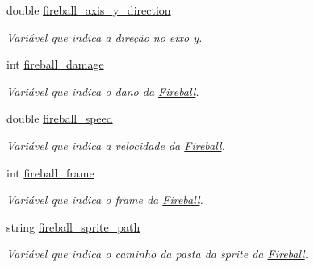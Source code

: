 \begin{DoxyCompactItemize}
double \mbox{\hyperlink{classFireball_a1d912b1e4229e9de2864024fc8b7f0a9}{fireball\+\_\+axis\+\_\+y\+\_\+direction}}
\begin{DoxyCompactList}\small\item\em Variável que indica a direção no eixo y. \end{DoxyCompactList}\item 
\mbox{\label{classFireball_a2ec7e1493414e15be2eef47f58010622}} 
int \mbox{\hyperlink{classFireball_a2ec7e1493414e15be2eef47f58010622}{fireball\+\_\+damage}}
\begin{DoxyCompactList}\small\item\em Variável que indica o dano da \mbox{\hyperlink{classFireball}{Fireball}}. \end{DoxyCompactList}\item 
\mbox{\label{classFireball_a75c66d806eac5f25c076f3bcf37b9613}} 
double \mbox{\hyperlink{classFireball_a75c66d806eac5f25c076f3bcf37b9613}{fireball\+\_\+speed}}
\begin{DoxyCompactList}\small\item\em Variável que indica a velocidade da \mbox{\hyperlink{classFireball}{Fireball}}. \end{DoxyCompactList}\item 
\mbox{\label{classFireball_a19675b5df10783f6ba27d4af14ac85b0}} 
int \mbox{\hyperlink{classFireball_a19675b5df10783f6ba27d4af14ac85b0}{fireball\+\_\+frame}}
\begin{DoxyCompactList}\small\item\em Variável que indica o frame da \mbox{\hyperlink{classFireball}{Fireball}}. \end{DoxyCompactList}\item 
\mbox{\label{classFireball_ac380cbdccf28a87ee27fae555a22561b}} 
string \mbox{\hyperlink{classFireball_ac380cbdccf28a87ee27fae555a22561b}{fireball\+\_\+sprite\+\_\+path}}
\begin{DoxyCompactList}\small\item\em Variável que indica o caminho da pasta da sprite da \mbox{\hyperlink{classFireball}{Fireball}}. \end{DoxyCompactList}\item 
\mbox{\label{classFireball_a4d1ebf057ecd8623b13b990b0176d322}} 

\end{DoxyCompactItemize}
